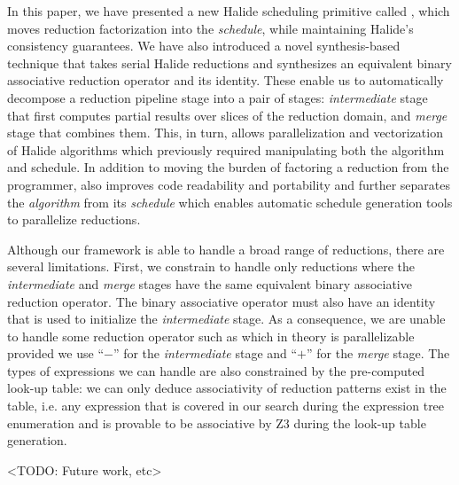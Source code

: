 In this paper, we have presented a new Halide scheduling primitive called , which moves reduction factorization into the \emph{schedule}, while maintaining Halide's consistency guarantees. We have also introduced a novel synthesis-based technique that takes serial Halide reductions and synthesizes an equivalent binary associative reduction operator and its identity. These enable us to automatically decompose a reduction pipeline stage into a pair of stages: \emph{intermediate} stage that first computes partial results over slices of the reduction domain, and \emph{merge} stage that combines them. This, in turn, allows parallelization and vectorization of Halide algorithms which previously required manipulating both the algorithm and schedule. In addition to moving the burden of factoring a reduction from the programmer,  also improves code readability and portability and further separates the \emph{algorithm} from its \emph{schedule} which enables automatic schedule generation tools to parallelize reductions. 

Although our framework is able to handle a broad range of reductions, there are several limitations. First, we constrain  to handle only reductions where the \emph{intermediate} and \emph{merge} stages have the same equivalent binary associative reduction operator. The binary associative operator must also have an identity that is used to initialize the \emph{intermediate} stage. As a consequence, we are unable to handle some reduction operator such as  which in theory is parallelizable provided we use ``$-$'' for the \emph{intermediate} stage and ``$+$'' for the \emph{merge} stage. The types of expressions we can handle are also constrained by the pre-computed look-up table: we can only deduce associativity of reduction patterns exist in the table, i.e. any expression that is covered in our search during the expression tree enumeration and is provable to be associative by Z3 during the look-up table generation. 

<TODO: Future work, etc>


